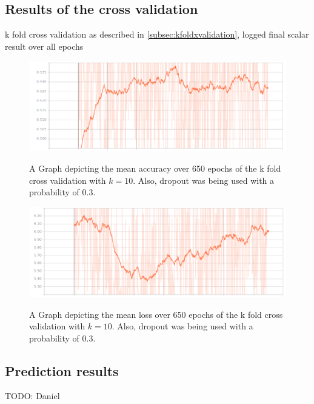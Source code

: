 \subsection{Results of the cross validation}
\label{subsec:xvalidationresults}
k fold cross validation as described in \ref{subsec:kfoldxvalidation}, logged final scalar result over all epochs
\begin{figure}[!ht]
	\caption{A Graph depicting the mean accuracy over 650 epochs of the k fold cross validation with $k=10$. Also, dropout was being used with a probability of 0.3. }
	\includegraphics[width=0.95\linewidth]{images/evaluation/650-epochs-k-crossvalidation-accuracy-mean.png}
	\label{fig:acc650epochs}
\end{figure}
\begin{figure}[!ht]
	\caption{A Graph depicting the mean loss over 650 epochs of the k fold cross validation with $k=10$. Also, dropout was being used with a probability of 0.3. }
	\includegraphics[width=0.95\linewidth]{images/evaluation/650-epochs-k-crossvalidation-loss-mean.png}
	\label{fig:loss650epochs}
\end{figure}

\subsection{Prediction results}
\label{subsec:predresults}
TODO: Daniel